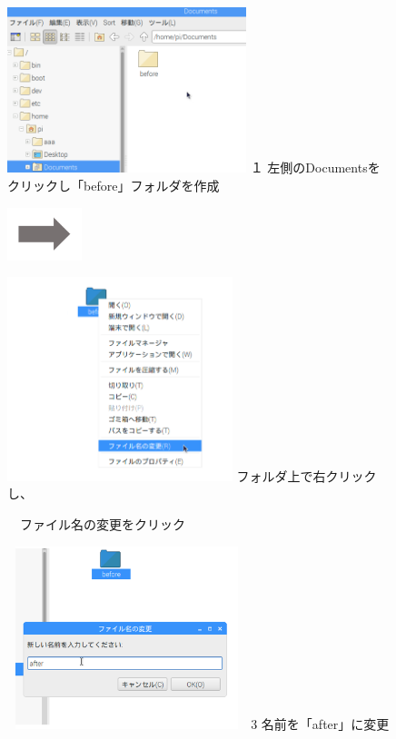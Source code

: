 \documentclass[a4paper,12pt]{jarticle}
\begin{document}
\begin{figure}[ht]
\begin{minipage}{6.656cm}
\includegraphics[width=6.96cm,height=4.824cm]{textbook-img058.png}
\flushleft
１
左側のDocumentsをクリックし「before」フォルダを作成
\end{minipage}
\includegraphics[width=2.168cm,height=1.542cm]{textbook-img052.png}
\begin{minipage}{5.751cm}
\includegraphics[width=6.555cm,height=5.941cm]{textbook-img057.png}
 フォルダ上で右クリックし、

　ファイル名の変更をクリック
\end{minipage}

\begin{minipage}{6.973cm}
\includegraphics[width=6.973cm,height=5.327cm]{textbook-img055.png}
3 名前を「after」に変更


\end{minipage}
\end{figure}
\end{document}
